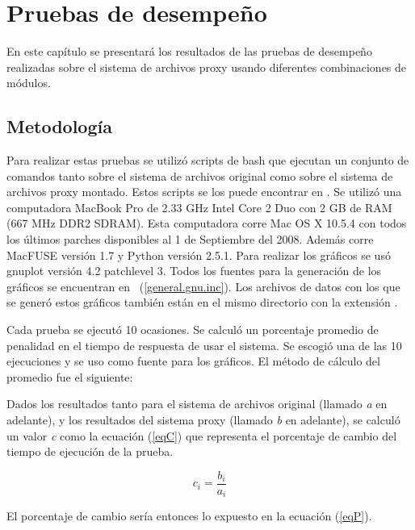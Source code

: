 \chapter{Pruebas de desempeño}
\ifpdf
    \graphicspath{{Chapter4/Chapter4Figs/PNG/}{Chapter4/Chapter4Figs/PDF/}{Chapter4/Chapter4Figs/}}
\else
    \graphicspath{{Chapter4/Chapter4Figs/EPS/}{Chapter4/Chapter4Figs/}}
\fi

En este capítulo se presentará los resultados de las pruebas de desempeño realizadas sobre el sistema de archivos proxy usando diferentes combinaciones de módulos.


\section{Metodología}

Para realizar estas pruebas se utilizó scripts de bash que ejecutan un conjunto de comandos tanto sobre el sistema de archivos original como sobre el sistema de archivos proxy montado. Estos scripts se los puede encontrar en . Se utilizó una computadora MacBook Pro de 2.33 GHz Intel Core 2 Duo con 2 GB de RAM (667 MHz DDR2 SDRAM). Esta computadora corre Mac OS X 10.5.4 con todos los últimos parches disponibles al 1 de Septiembre del 2008. Además corre MacFUSE versión 1.7 y Python versión 2.5.1. Para realizar los gráficos se usó gnuplot versión 4.2 patchlevel 3. Todos los fuentes para la generación de los gráficos se encuentran en ~(\ref{general.gnu.inc}). Los archivos de datos con los que se generó estos gráficos también están en el mismo directorio con la extensión .

Cada prueba se ejecutó 10 ocasiones.  Se calculó un porcentaje promedio de penalidad en el tiempo de respuesta de usar el sistema. Se escogió una de las 10 ejecuciones y se uso como fuente para los gráficos. El método de cálculo del promedio fue el siguiente:

Dados los resultados tanto para el sistema de archivos original (llamado \textit{a} en adelante), y los resultados del sistema proxy (llamado \textit{b} en adelante), se calculó un valor \textit{c} como la ecuación (\ref{eqC}) que representa el porcentaje de cambio del tiempo de ejecución de la prueba.

\begin{equation}
\label{eqC}
c_{i} = \frac{b_{i}}{a_{i}}
\end{equation}

El porcentaje de cambio sería entonces lo expuesto en la ecuación (\ref{eqP}).


